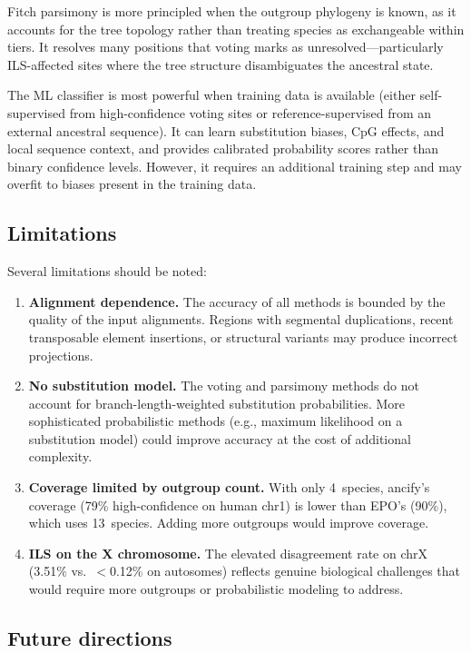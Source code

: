 \documentclass[11pt,a4paper]{article}
\begin{document}
Fitch parsimony is more principled when the outgroup phylogeny is known,
as it accounts for the tree topology rather than treating species as
exchangeable within tiers. It resolves many positions that voting marks as
unresolved---particularly ILS-affected sites where the tree structure
disambiguates the ancestral state.

The ML classifier is most powerful when training data is available (either
self-supervised from high-confidence voting sites or reference-supervised
from an external ancestral sequence). It can learn substitution biases,
CpG effects, and local sequence context, and provides calibrated probability
scores rather than binary confidence levels. However, it requires an
additional training step and may overfit to biases present in the training
data.

\subsection{Limitations}

Several limitations should be noted:

\begin{enumerate}
    \item \textbf{Alignment dependence.} The accuracy of all methods is
        bounded by the quality of the input alignments. Regions with
        segmental duplications, recent transposable element insertions, or
        structural variants may produce incorrect projections.
    \item \textbf{No substitution model.} The voting and parsimony methods
        do not account for branch-length-weighted substitution probabilities.
        More sophisticated probabilistic methods (e.g., maximum likelihood
        on a substitution model) could improve accuracy at the cost of
        additional complexity.
    \item \textbf{Coverage limited by outgroup count.} With only 4~species,
        ancify's coverage (79\% high-confidence on human chr1) is lower than
        EPO's (90\%), which uses 13~species. Adding more outgroups would
        improve coverage.
    \item \textbf{ILS on the X chromosome.} The elevated disagreement rate
        on chrX (3.51\% vs.\ $<$0.12\% on autosomes) reflects genuine
        biological challenges that would require more outgroups or
        probabilistic modeling to address.
\end{enumerate}

\subsection{Future directions}
\end{document}
